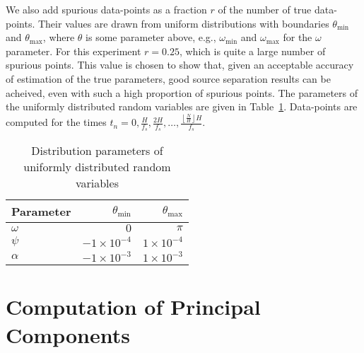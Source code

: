 We also add spurious data-points as a fraction $r$ of the number of true
data-points.  Their values are drawn from uniform distributions with boundaries
$\theta_{\text{min}}$ and $\theta_{\text{max}}$, where $\theta$ is some
parameter above, e.g., $\omega_{\text{min}}$ and $\omega_{\text{max}}$ for the
$\omega$ parameter. For this experiment $r = 0.25$, which is quite a large
number of spurious points. This value is chosen to show that, given an
acceptable accuracy of estimation of the true parameters, good source separation
results can be acheived, even with such a high proportion of spurious points.
The parameters of the uniformly distributed random variables are given in
Table~\ref{tab:amfmspuriousuniformparams}. Data-points are computed for the
times $t_{n} = 0,\frac{H}{f_{s}},\frac{2 H}{f_{s}},\ldots,\frac{\left\lfloor
\frac{N}{H} \right\rfloor H}{f_{s}}$.
\begin{table}
    \caption{Distribution parameters of uniformly distributed random
    variables\label{tab:amfmspuriousuniformparams}}
    \begin{center}
        \begin{tabular}{l r r}
            Parameter & $\theta_{\text{min}}$ & $\theta_{\text{max}}$ \\
            \hline
            $\omega$  & $0$ & $\pi$ \\
            $\psi$    & $-1 \times 10^{-4}$ & $1 \times 10^{-4}$ \\
            $\alpha$  & $-1 \times 10^{-3}$ & $1 \times 10^{-3}$ \\
        \end{tabular}
    \end{center}
\end{table}

\section{Computation of Principal Components}

